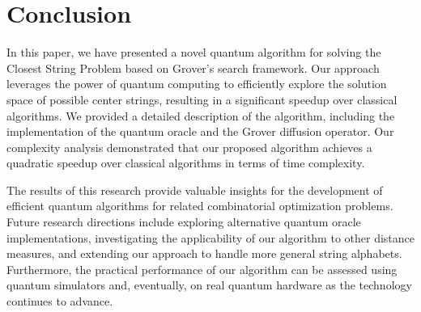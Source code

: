 \section{Conclusion}\label{sec:conclusion}

In this paper, we have presented a novel quantum algorithm for solving the Closest String Problem based on Grover's search framework. Our approach leverages the power of quantum computing to efficiently explore the solution space of possible center strings, resulting in a significant speedup over classical algorithms. We provided a detailed description of the algorithm, including the implementation of the quantum oracle and the Grover diffusion operator. Our complexity analysis demonstrated that our proposed algorithm achieves a quadratic speedup over classical algorithms in terms of time complexity.

The results of this research provide valuable insights for the development of efficient quantum algorithms for related combinatorial optimization problems. Future research directions include exploring alternative quantum oracle implementations, investigating the applicability of our algorithm to other distance measures, and extending our approach to handle more general string alphabets. Furthermore, the practical performance of our algorithm can be assessed using quantum simulators and, eventually, on real quantum hardware as the technology continues to advance.

